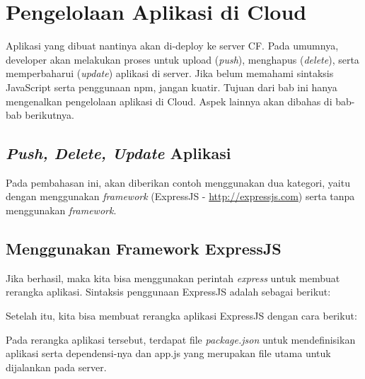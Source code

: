 \section{Pengelolaan Aplikasi di Cloud}

Aplikasi yang dibuat nantinya akan di-deploy ke server CF. Pada umumnya, developer akan melakukan proses untuk upload (\textit{push}), menghapus (\textit{delete}), serta memperbaharui (\textit{update}) aplikasi di server. Jika belum memahami sintaksis JavaScript serta penggunaan npm, jangan kuatir. Tujuan dari bab ini hanya mengenalkan pengelolaan aplikasi di Cloud. Aspek lainnya akan dibahas di bab-bab berikutnya.

\subsection{\textit{Push, Delete, Update} Aplikasi}

Pada pembahasan ini, akan diberikan contoh menggunakan dua kategori, yaitu dengan menggunakan \textit{framework} (ExpressJS - \url{http://expressjs.com}) serta tanpa menggunakan \textit{framework}.

\subsection{Menggunakan Framework ExpressJS}

\lstset{language=bash,caption=Instalasi ExpressJS menggunakan npm}


Jika berhasil, maka kita bisa menggunakan perintah \textit{express} untuk membuat rerangka aplikasi. Sintaksis penggunaan ExpressJS adalah sebagai berikut:

\lstset{language=bash,caption=Perintah express}


Setelah itu, kita bisa membuat rerangka aplikasi ExpressJS dengan cara berikut:

\lstset{language=bash,caption=Menggunakan express untuk membuat rerangka aplikasi}


Pada rerangka aplikasi tersebut, terdapat file \textit{package.json} untuk mendefinisikan aplikasi serta dependensi-nya dan app.js yang merupakan file utama untuk dijalankan pada server.

\lstset{language=Javascript,caption=package.json untuk ExpressJS}


